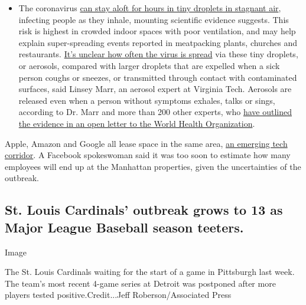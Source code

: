 \begin{itemize}
  \begin{itemize}
  \tightlist
  \item
    The coronavirus
    \href{https://www.nytimes3xbfgragh.onion/2020/07/04/health/239-experts-with-one-big-claim-the-coronavirus-is-airborne.html?action=click\&pgtype=Article\&state=default\&region=MAIN_CONTENT_3\&context=storylines_faq}{can
    stay aloft for hours in tiny droplets in stagnant air}, infecting
    people as they inhale, mounting scientific evidence suggests. This
    risk is highest in crowded indoor spaces with poor ventilation, and
    may help explain super-spreading events reported in meatpacking
    plants, churches and restaurants.
    \href{https://www.nytimes3xbfgragh.onion/2020/07/06/health/coronavirus-airborne-aerosols.html?action=click\&pgtype=Article\&state=default\&region=MAIN_CONTENT_3\&context=storylines_faq}{It's
    unclear how often the virus is spread} via these tiny droplets, or
    aerosols, compared with larger droplets that are expelled when a
    sick person coughs or sneezes, or transmitted through contact with
    contaminated surfaces, said Linsey Marr, an aerosol expert at
    Virginia Tech. Aerosols are released even when a person without
    symptoms exhales, talks or sings, according to Dr. Marr and more
    than 200 other experts, who
    \href{https://academic.oup.com/cid/article/doi/10.1093/cid/ciaa939/5867798}{have
    outlined the evidence in an open letter to the World Health
    Organization}.
  \end{itemize}
\end{itemize}

Apple, Amazon and Google all lease space in the same area,
\href{https://www.nytimes3xbfgragh.onion/2020/01/05/nyregion/nyc-tech-facebook-amazon-google.html}{an
emerging tech corridor}. A Facebook spokeswoman said it was too soon to
estimate how many employees will end up at the Manhattan properties,
given the uncertainties of the outbreak.

\hypertarget{st-louis-cardinals-outbreak-grows-to-13-as-major-league-baseball-season-teeters}{%
\subsection{St. Louis Cardinals' outbreak grows to 13 as Major League
Baseball season
teeters.}\label{st-louis-cardinals-outbreak-grows-to-13-as-major-league-baseball-season-teeters}}

Image

The St. Louis Cardinals waiting for the start of a game in Pittsburgh
last week. The team's most recent 4-game series at Detroit was postponed
after more players tested positive.Credit...Jeff Roberson/Associated
Press

